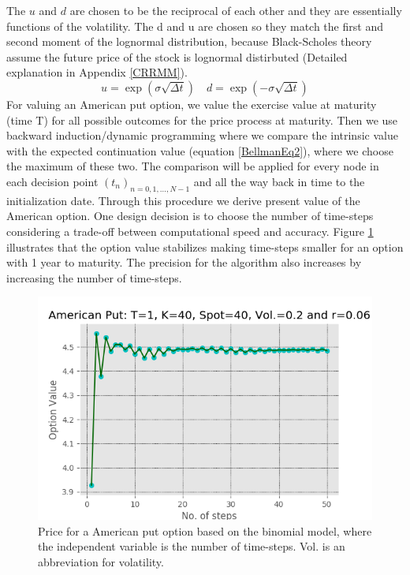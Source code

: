 The $u$ and $d$ are chosen to be the reciprocal of each other and they are essentially functions of the volatility. The d and u are chosen so they match the first and second moment of the lognormal distribution, because Black-Scholes theory assume the future price of the stock is lognormal distirbuted (Detailed explanation in Appendix \ref{CRRMM}).
$$u= \exp(\sigma \sqrt{\Delta t}) \quad d= \exp(-\sigma \sqrt{\Delta t})$$
For valuing an American put option, we value the exercise value at maturity (time T) for all possible outcomes for the price process at maturity. Then we use backward induction/dynamic programming where we compare the intrinsic value with the expected continuation value (equation \eqref{BellmanEq2}), where we choose the maximum of these two. The comparison will be applied for every node in each decision point $(t_{n})_{n=0,1,\ldots,N-1}$ and all the way back in time to the initialization date. Through this procedure we derive present value of the American option. One design decision is to choose the number of time-steps considering a trade-off between computational speed and accuracy. Figure \ref{fig:binConv} illustrates that the option value stabilizes making time-steps smaller for an option with 1 year to maturity. The precision for the algorithm also increases by increasing the number of time-steps.\\

\begin{figure}[th]
\centering
\includegraphics{Figures/binConv.png}
\decoRule
\caption[Convergence of Binomial Model]{Price for a American put option based on the binomial model, where the independent variable is the number of time-steps. Vol. is an abbreviation for volatility.}
\label{fig:binConv}
\end{figure}

